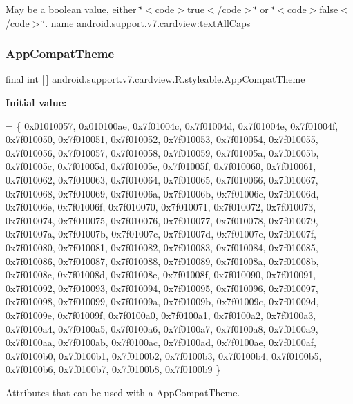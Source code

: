 May be a boolean value, either \char`\"{}$<$code$>$true$<$/code$>$\char`\"{} or \char`\"{}$<$code$>$false$<$/code$>$\char`\"{}.  name android.\+support.\+v7.\+cardview\+:text\+All\+Caps \mbox{\label{classandroid_1_1support_1_1v7_1_1cardview_1_1R_1_1styleable_a52e6f69f954ecc2622d72c0b4d298938}} 
\subsubsection{\texorpdfstring{App\+Compat\+Theme}{AppCompatTheme}}
{\footnotesize\ttfamily final int \mbox{[}$\,$\mbox{]} android.\+support.\+v7.\+cardview.\+R.\+styleable.\+App\+Compat\+Theme\hspace{0.3cm}{\ttfamily [static]}}

{\bfseries Initial value\+:}
\begin{DoxyCode}
= \{
            0x01010057, 0x010100ae, 0x7f01004c, 0x7f01004d,
            0x7f01004e, 0x7f01004f, 0x7f010050, 0x7f010051,
            0x7f010052, 0x7f010053, 0x7f010054, 0x7f010055,
            0x7f010056, 0x7f010057, 0x7f010058, 0x7f010059,
            0x7f01005a, 0x7f01005b, 0x7f01005c, 0x7f01005d,
            0x7f01005e, 0x7f01005f, 0x7f010060, 0x7f010061,
            0x7f010062, 0x7f010063, 0x7f010064, 0x7f010065,
            0x7f010066, 0x7f010067, 0x7f010068, 0x7f010069,
            0x7f01006a, 0x7f01006b, 0x7f01006c, 0x7f01006d,
            0x7f01006e, 0x7f01006f, 0x7f010070, 0x7f010071,
            0x7f010072, 0x7f010073, 0x7f010074, 0x7f010075,
            0x7f010076, 0x7f010077, 0x7f010078, 0x7f010079,
            0x7f01007a, 0x7f01007b, 0x7f01007c, 0x7f01007d,
            0x7f01007e, 0x7f01007f, 0x7f010080, 0x7f010081,
            0x7f010082, 0x7f010083, 0x7f010084, 0x7f010085,
            0x7f010086, 0x7f010087, 0x7f010088, 0x7f010089,
            0x7f01008a, 0x7f01008b, 0x7f01008c, 0x7f01008d,
            0x7f01008e, 0x7f01008f, 0x7f010090, 0x7f010091,
            0x7f010092, 0x7f010093, 0x7f010094, 0x7f010095,
            0x7f010096, 0x7f010097, 0x7f010098, 0x7f010099,
            0x7f01009a, 0x7f01009b, 0x7f01009c, 0x7f01009d,
            0x7f01009e, 0x7f01009f, 0x7f0100a0, 0x7f0100a1,
            0x7f0100a2, 0x7f0100a3, 0x7f0100a4, 0x7f0100a5,
            0x7f0100a6, 0x7f0100a7, 0x7f0100a8, 0x7f0100a9,
            0x7f0100aa, 0x7f0100ab, 0x7f0100ac, 0x7f0100ad,
            0x7f0100ae, 0x7f0100af, 0x7f0100b0, 0x7f0100b1,
            0x7f0100b2, 0x7f0100b3, 0x7f0100b4, 0x7f0100b5,
            0x7f0100b6, 0x7f0100b7, 0x7f0100b8, 0x7f0100b9
        \}
\end{DoxyCode}
Attributes that can be used with a App\+Compat\+Theme. 

